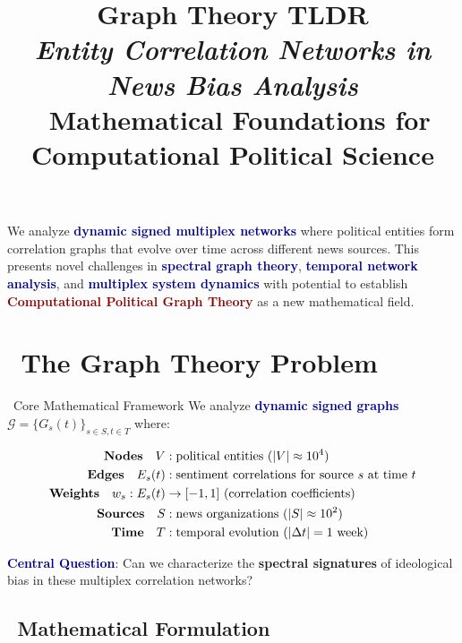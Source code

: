 \documentclass[11pt]{article}
\title{
\begin{tcolorbox}[colback=darkblue!90, coltext=white, halign=center, arc=5mm, boxrule=0pt]
\Huge \textbf{Graph Theory TLDR} \\[0.3cm]
\Large \textit{Entity Correlation Networks in News Bias Analysis} \\[0.2cm]
\normalsize \faLightbulb \, Mathematical Foundations for Computational Political Science
\end{tcolorbox}
}
\author{}
\date{}
\newcommand{\highlight}[1]{\textcolor{darkblue}{\textbf{#1}}}
\newcommand{\warning}[1]{\textcolor{darkred}{\textbf{#1}}}
\begin{document}
\maketitle

\begin{tcolorbox}[colback=gray!10, colframe=gray, title=\faInfoCircle \, Executive Summary, fonttitle=\bfseries]
We analyze \highlight{dynamic signed multiplex networks} where political entities form correlation graphs that evolve over time across different news sources. This presents novel challenges in \highlight{spectral graph theory}, \highlight{temporal network analysis}, and \highlight{multiplex system dynamics} with potential to establish \warning{Computational Political Graph Theory} as a new mathematical field.
\end{tcolorbox}

\section{\faChartNetwork \, The Graph Theory Problem}

\begin{problembox}{\faExclamationTriangle \, Core Mathematical Framework}
We analyze \highlight{dynamic signed graphs} $\mathcal{G} = \{G_s(t)\}_{s \in S, t \in T}$ where:

\begin{align}
\text{\textbf{Nodes}} \quad V &: \text{political entities } (|V| \approx 10^4) \\
\text{\textbf{Edges}} \quad E_s(t) &: \text{sentiment correlations for source } s \text{ at time } t \\
\text{\textbf{Weights}} \quad w_s: E_s(t) &\to [-1,1] \text{ (correlation coefficients)} \\
\text{\textbf{Sources}} \quad S &: \text{news organizations } (|S| \approx 10^2) \\
\text{\textbf{Time}} \quad T &: \text{temporal evolution } (|\Delta t| = 1 \text{ week})
\end{align}

\highlight{Central Question}: Can we characterize the \textbf{spectral signatures} of ideological bias in these multiplex correlation networks?
\end{problembox}

\subsection{\faCogs \, Mathematical Formulation}
\end{document}
